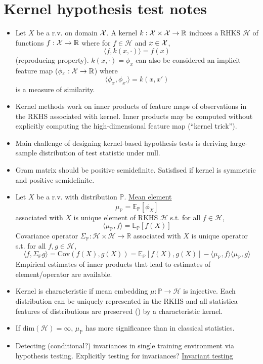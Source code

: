 \documentclass[10pt]{article}
\begin{document}
\section{Kernel hypothesis test notes}

\begin{itemize}

\item
Let $X$ be a r.v. on domain $\mathcal{X}$. A kernel $k:\mathcal{X}\times\mathcal{X}\rightarrow\mathbb{R}$ induces a RHKS $\mathcal{H}$ of functions $f:\mathcal{X}\rightarrow\mathbb{R}$ where for $f\in\mathcal{H}$ and $x\in\mathcal{X}$,
\[
\langle f,k(x,\cdot)\rangle = f(x)
\]
(reproducing property). $k(x,\cdot)=\phi_x$ can also be considered an implicit feature map ($\phi_x:\mathcal{X}\rightarrow\mathbb{R}$) where
\[
\langle \phi_x,\phi_{x'}\rangle = k(x,x')
\]
is a measure of similarity.

\item
Kernel methods work on inner products of feature maps of observations in the RKHS associated with kernel. Inner products may be computed without explicitly computing the high-dimensional feature map (``kernel trick'').

\item
Main challenge of designing kernel-based hypothesis tests is deriving large-sample distribution of test statistic under null.

\item
Gram matrix should be positive semidefinite. Satisfised if kernel is symmetric and positive semidefinite.

\item
Let $X$ be a r.v. with distribution $\mathbb{P}$. \href{https://en.wikipedia.org/wiki/Kernel_embedding_of_distributions}{Mean element}
\[
\mu_\mathbb{P} = \mathbb{E}_{\mathbb{P}}[\phi_X]
\]
associated with $X$ is unique element of RKHS $\mathcal{H}$ s.t. for all $f\in\mathcal{H}$,
\[
\langle\mu_\mathbb{P},f\rangle = \mathbb{E}_\mathbb{P}[f(X)]
\]
Covariance operator $\Sigma_\mathbb{P}:\mathcal{H}\times \mathcal{H}\rightarrow\mathbb{R}$ associated with $X$ is unique operator s.t. for all $f,g\in\mathcal{H}$,
\[
\langle f, \Sigma_\mathbb{P}g\rangle = \mathrm{Cov}(f(X),g(X)) = \mathbb{E}_\mathbb{P}[f(X),g(X)] - \langle\mu_\mathbb{P},f\rangle\langle\mu_\mathbb{P},g\rangle
\]
Empirical estimates of inner products that lead to estimates of element/operator are available.

\item
Kernel is characteristic if mean embedding $\mu:\mathbb{P}\rightarrow\mathcal{H}$ is injective. Each distribution can be uniquely represented in the RKHS and all statistica features of distributions are preserved (\todo) by a characteristic kernel.

\item
If $\mathrm{dim}(\mathcal{H})=\infty$, $\mu_\mathbb{P}$ has more significance than in classical statistics.

\item
Detecting (conditional?) invariances in single training environment via hypothesis testing. Explicitly testing for invariances? \href{https://www.sciencedirect.com/science/article/pii/S0047259X03000447}{Invariant testing}

\end{itemize}
\end{document}
